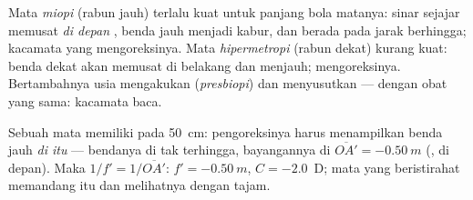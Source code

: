 \begin{definition}\label{def:g11:lenses-and-eye:defects}
Mata \emph{miopi} (rabun jauh) terlalu kuat untuk panjang
bola matanya: sinar sejajar memusat \emph{di depan} , benda
jauh menjadi kabur, dan  berada pada jarak berhingga;
 kacamata yang  mengoreksinya. Mata
\emph{hipermetropi} (rabun dekat) kurang kuat:
benda dekat akan memusat di belakang  dan 
menjauh;  mengoreksinya. Bertambahnya usia mengakukan
 (\emph{presbiopi}) dan menyusutkan
 --- dengan obat yang sama: kacamata baca.
\end{definition}

\begin{example}\label{ex:g11:lenses-and-eye:correction}
Sebuah mata  memiliki  pada \qty{50}{cm}: 
pengoreksinya harus menampilkan benda jauh \emph{di  itu} ---
bendanya di tak terhingga, bayangannya di
$\overline{OA'} = \qty{-0.50}{m}$ (, di depan). Maka
$1/f' = 1/\overline{OA'}$: $f' = \qty{-0.50}{m}$, $C = -2.0$~D; mata
yang beristirahat memandang  itu dan melihatnya dengan
tajam.
\end{example}


